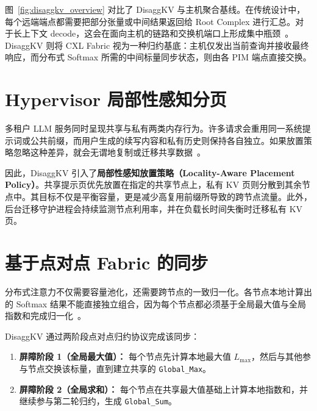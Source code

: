 图~\ref{fig:disaggkv_overview} 对比了 DisaggKV 与主机聚合基线。在传统设计中，每个远端端点都需要把部分张量或中间结果返回给 Root Complex 进行汇总。对于长上下文 decode，这会在面向主机的链路和交换机端口上形成集中瓶颈~\cite{cxl_pond}。DisaggKV 则将 CXL Fabric 视为一种归约基底：主机仅发出当前查询并接收最终响应，而分布式 Softmax 所需的中间标量同步状态，则由各 PIM 端点直接交换。

\section{Hypervisor 局部性感知分页}

多租户 LLM 服务同时呈现共享与私有两类内存行为。许多请求会重用同一系统提示词或公共前缀，而用户生成的续写内容和私有历史则保持各自独立。如果放置策略忽略这种差异，就会无谓地复制或迁移共享数据~\cite{splitwise}。

因此，DisaggKV 引入了\textbf{局部性感知放置策略（Locality-Aware Placement Policy）}。共享提示页优先放置在指定的共享节点上，私有 KV 页则分散到其余节点中。其目标不仅是平衡容量，更是减少高复用前缀所导致的跨节点流量。此外，后台迁移守护进程会持续监测节点利用率，并在负载长时间失衡时迁移私有 KV 页。

\section{基于点对点 Fabric 的同步}

分布式注意力不仅需要容量池化，还需要跨节点的一致归一化。各节点本地计算出的 Softmax 结果不能直接独立组合，因为每个节点都必须基于全局最大值与全局指数和完成归一化~\cite{ring_attention}。

DisaggKV 通过两阶段点对点归约协议完成该同步：
\begin{enumerate}
    \item \textbf{屏障阶段 1（全局最大值）：} 每个节点先计算本地最大值 $L_{\max}$，然后与其他参与节点交换该标量，直到建立共享的 \texttt{Global\_Max}。
    \item \textbf{屏障阶段 2（全局求和）：} 每个节点在共享最大值基础上计算本地指数和，并继续参与第二轮归约，生成 \texttt{Global\_Sum}。
\end{enumerate}

